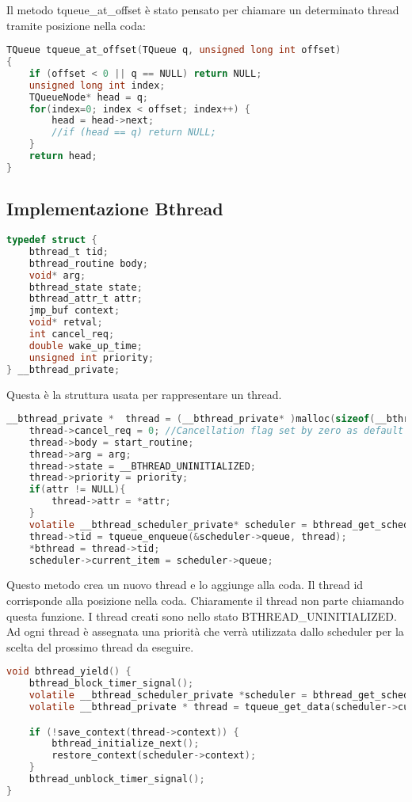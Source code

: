 \documentclass{article}
\begin{document}
\newpage
Il metodo tqueue\_at\_offset è stato pensato per chiamare un determinato thread tramite posizione nella coda:

\begin{lstlisting}[language=C]
TQueue tqueue_at_offset(TQueue q, unsigned long int offset)
{
    if (offset < 0 || q == NULL) return NULL;
    unsigned long int index;
    TQueueNode* head = q;
    for(index=0; index < offset; index++) {
        head = head->next;
        //if (head == q) return NULL;
    }
    return head;
}
\end{lstlisting}
\subsection{Implementazione Bthread}
\vspace{2mm}
\begin{lstlisting}[language=C]
typedef struct {
    bthread_t tid;
    bthread_routine body;
    void* arg;
    bthread_state state;
    bthread_attr_t attr;
    jmp_buf context;
    void* retval;
    int cancel_req;
    double wake_up_time;
    unsigned int priority;
} __bthread_private;
\end{lstlisting}
Questa è la struttura usata per rappresentare un thread.

\begin{lstlisting}[language=C]
__bthread_private *  thread = (__bthread_private* )malloc(sizeof(__bthread_private));
    thread->cancel_req = 0; //Cancellation flag set by zero as default
    thread->body = start_routine;
    thread->arg = arg;
    thread->state = __BTHREAD_UNINITIALIZED;
    thread->priority = priority;
    if(attr != NULL){
        thread->attr = *attr;
    }
    volatile __bthread_scheduler_private* scheduler = bthread_get_scheduler();
    thread->tid = tqueue_enqueue(&scheduler->queue, thread);
    *bthread = thread->tid;
    scheduler->current_item = scheduler->queue;
\end{lstlisting}

Questo metodo crea un nuovo thread e lo aggiunge alla coda. Il thread id corrisponde alla posizione nella coda. Chiaramente il thread non parte chiamando questa funzione. I thread creati sono nello stato BTHREAD\_UNINITIALIZED. Ad ogni thread è assegnata una priorità che verrà utilizzata dallo scheduler per la scelta del prossimo thread da eseguire.

\begin{lstlisting}[language=C]
void bthread_yield() {
    bthread_block_timer_signal();
    volatile __bthread_scheduler_private *scheduler = bthread_get_scheduler();
    volatile __bthread_private * thread = tqueue_get_data(scheduler->current_item);

    if (!save_context(thread->context)) {
        bthread_initialize_next();
        restore_context(scheduler->context);
    }
    bthread_unblock_timer_signal();
}
\end{lstlisting}
\end{document}
